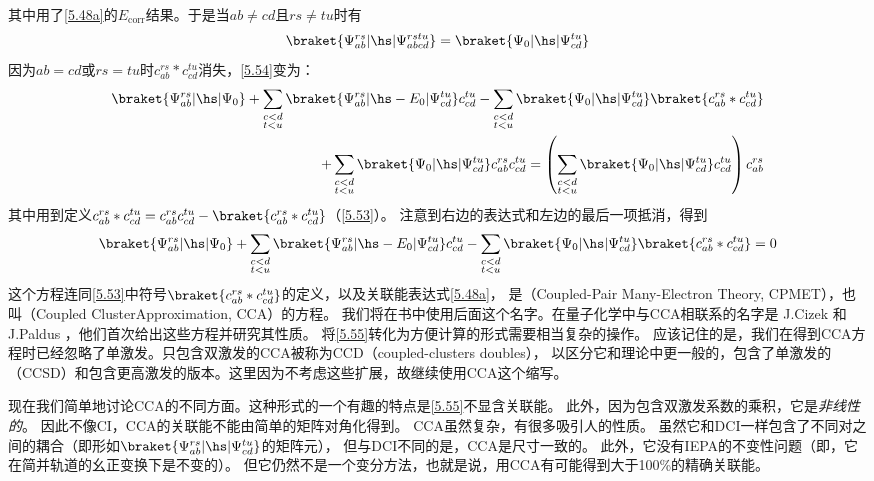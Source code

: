 其中用了\autoref{5.48a}的$E_{\text{corr}}$结果。于是当$ab\neq cd$且$rs\neq tu$时有
\begin{align*}
    \braket{\Psi_{ab}^{rs}|\hs|\Psi_{abcd}^{rstu}}=\braket{\Psi_0|\hs|\Psi_{cd}^{tu}}
\end{align*}
因为$ab=cd$或$rs=tu$时$c_{ab}^{rs}*c_{cd}^{tu}$消失，\autoref{5.54}变为：
\begin{align*}
    \braket{\Psi_{ab}^{rs}|\hs|\Psi_0}+\sum_{\substack{c<d\\t<u}}\braket{\Psi_{ab}^{rs}|\hs-E_0|\Psi_{cd}^{tu}}c_{cd}^{tu}
    -\sum_{\substack{c<d\\t<u}}\braket{\Psi_0|\hs|\Psi_{cd}^{tu}}\braket{c_{ab}^{rs}*c_{cd}^{tu}} \\
    +\sum_{\substack{c<d\\t<u}}\braket{\Psi_0|\hs|\Psi_{cd}^{tu}}c_{ab}^{rs}c_{cd}^{tu}
    =\left(\sum_{\substack{c<d\\t<u}}\braket{\Psi_0|\hs|\Psi_{cd}^{tu}}c_{cd}^{tu}\right)c_{ab}^{rs}
\end{align*}
其中用到定义$c_{ab}^{rs}*c_{cd}^{tu}=c_{ab}^{rs}c_{cd}^{tu}-\braket{c_{ab}^{rs}*c_{cd}^{tu}}$（\autoref{5.53}）。
注意到右边的表达式和左边的最后一项抵消，得到
\begin{align}
    \label{5.55}
    \braket{\Psi_{ab}^{rs}|\hs|\Psi_0}+\sum_{\substack{c<d\\t<u}}\braket{\Psi_{ab}^{rs}|\hs-E_0|\Psi_{cd}^{tu}}c_{cd}^{tu}
    -\sum_{\substack{c<d\\t<u}}\braket{\Psi_0|\hs|\Psi_{cd}^{tu}}\braket{c_{ab}^{rs}*c_{cd}^{tu}} =0
\end{align}
这个方程连同\autoref{5.53}中符号$\braket{c_{ab}^{rs}*c_{cd}^{tu}}$的定义，以及关联能表达式\autoref{5.48a}，
是（Coupled-Pair Many-Electron Theory, CPMET），也叫（Coupled ClusterApproximation, CCA）的方程。
我们将在书中使用后面这个名字。在量子化学中与CCA相联系的名字是 J.Cizek 和 J.Paldus
 ，他们首次给出这些方程并研究其性质。
将\autoref{5.55}转化为方便计算的形式需要相当复杂的操作。
应该记住的是，我们在得到CCA方程时已经忽略了单激发。只包含双激发的CCA被称为CCD（coupled-clusters doubles），
以区分它和理论中更一般的，包含了单激发的（CCSD）和包含更高激发的版本。这里因为不考虑这些扩展，故继续使用CCA这个缩写。

现在我们简单地讨论CCA的不同方面。这种形式的一个有趣的特点是\autoref{5.55}不显含关联能。
此外，因为包含双激发系数的乘积，它是\emph{非线性的}。
因此不像CI，CCA的关联能不能由简单的矩阵对角化得到。
CCA虽然复杂，有很多吸引人的性质。
虽然它和DCI一样包含了不同对之间的耦合（即形如$\braket{\Psi_{ab}^{rs}|\hs|\Psi_{cd}^{tu}}$的矩阵元），
但与DCI不同的是，CCA是尺寸一致的。
此外，它没有IEPA的不变性问题（即，它在简并轨道的幺正变换下是不变的）。
但它仍然不是一个变分方法，也就是说，用CCA有可能得到大于100\%的精确关联能。

